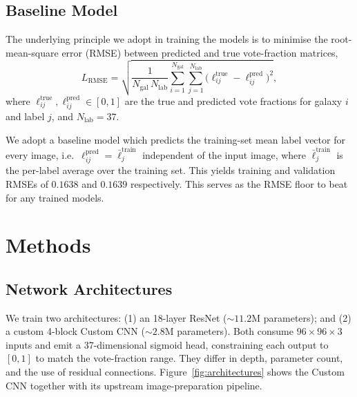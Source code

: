 \documentclass[10pt,preprint2]{aastex}
\begin{document}
\subsection{Baseline Model}

The underlying principle we adopt in training the models is to minimise the root-mean-square error (RMSE) between predicted and true vote-fraction matrices,
\begin{equation}
  L_{\mathrm{RMSE}} = \sqrt{\frac{1}{N_{\mathrm{gal}}\,N_{\mathrm{lab}}} \sum_{i=1}^{N_{\mathrm{gal}}} \sum_{j=1}^{N_{\mathrm{lab}}} \bigl(\ell^{\mathrm{true}}_{ij} - \ell^{\mathrm{pred}}_{ij}\bigr)^2},
  \label{eq:rmse}
\end{equation}
where $\ell^{\mathrm{true}}_{ij}, \ell^{\mathrm{pred}}_{ij} \in [0, 1]$ are the true and predicted vote fractions for galaxy $i$ and label $j$, and $N_{\mathrm{lab}} = 37$. 

We adopt a baseline model which predicts the training-set mean label vector for every image, i.e.\ $\ell^{\mathrm{pred}}_{ij} = \bar{\ell}^{\mathrm{train}}_j$ independent of the input image, where $\bar{\ell}^{\mathrm{train}}_j$ is the per-label average over the training set. This yields training and validation RMSEs of $0.1638$ and $0.1639$ respectively. This serves as the RMSE floor to beat for any trained models.

\section{Methods}
\label{sec:methods}

\subsection{Network Architectures}
\label{sec:architectures}

We train two architectures: (1) an 18-layer ResNet ($\sim 11.2$M parameters); and (2) a custom 4-block Custom CNN ($\sim 2.8$M parameters). Both consume $96 \times 96 \times 3$ inputs and emit a 37-dimensional sigmoid head, constraining each output to $[0, 1]$ to match the vote-fraction range. They differ in depth, parameter count, and the use of residual connections. Figure~\ref{fig:architectures} shows the Custom CNN together with its upstream image-preparation pipeline. 
\end{document}
